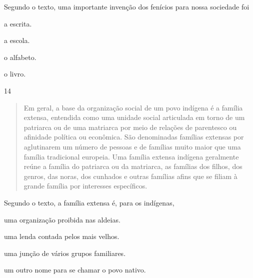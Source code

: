 Segundo o texto, uma importante invenção dos fenícios para nossa sociedade foi

\begin{minipage}{.5\textwidth}
\begin{escolha}
\item a escrita.

\item a escola.

\item o alfabeto.

\item o livro.
\end{escolha}
\end{minipage}


\num{14}

\begin{quote}
Em geral, a base da organização social de um povo indígena é a
família extensa, entendida como uma unidade social articulada em torno
de um patriarca ou de uma matriarca por meio de relações de parentesco
ou afinidade política ou econômica. São denominadas famílias extensas
por aglutinarem um número de pessoas e de famílias muito maior que uma
família tradicional europeia. Uma família extensa indígena geralmente
reúne a família do patriarca ou da matriarca, as famílias dos filhos,
dos genros, das noras, dos cunhados e outras famílias afins que se
filiam à grande família por interesses específicos.

\end{quote}

\noindent{}Segundo o texto, a família extensa é, para os indígenas,

\begin{escolha}
\item uma organização proibida nas aldeias.

\item uma lenda contada pelos mais velhos.

\item uma junção de vários grupos familiares.

\item um outro nome para se chamar o povo nativo.
\end{escolha}

